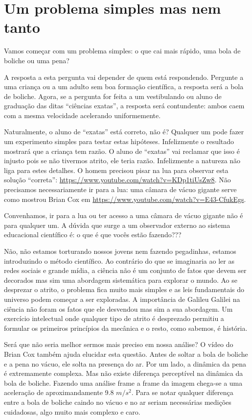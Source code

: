 \chapter{Um problema simples mas nem tanto}
\label{sec:intro}

Vamos começar com um problema simples: o que cai mais rápido, uma bola de boliche ou uma pena?

A resposta a esta pergunta vai depender de quem está respondendo. Pergunte a uma criança ou a um adulto sem boa formação científica, a resposta será a bola de boliche. Agora, se a pergunta for feita a um vestibulando ou aluno de graduação das ditas ``ciências exatas'', a resposta será contundente: ambos caem com a mesma velocidade acelerando uniformemente.

Naturalmente, o aluno de ``exatas'' está correto, não é? Qualquer um pode fazer um experimento simples para testar estas hipóteses. Infelizmente o resultado mostrará que a criança tem razão. O aluno de ``exatas'' vai reclamar que isso é injusto pois se não tivermos atrito, ele teria razão. Infelizmente a natureza não liga para estes detalhes. O homem precisou pisar na lua para observar esta solução ``correta'': \url{https://www.youtube.com/watch?v=KDp1tiUsZw8}. Não precisamos necessariamente ir para a lua: uma câmara de vácuo gigante serve como mostrou Brian Cox em \url{https://www.youtube.com/watch?v=E43-CfukEgs}.

Convenhamos, ir para a lua ou ter acesso a uma câmara de vácuo gigante não é para qualquer um. A dúvida que surge a um observador externo ao sistema educacional científico é: o que é que vocês estão fazendo???

Não, não estamos torturando nossos jovens nem fazendo pegadinhas, estamos introduzindo o método científico. Ao contrário do que se imaginaria ao ler as redes sociais e grande mídia, a ciência não é um conjunto de fatos que devem ser decorados mas sim uma abordagem sistemática para explorar o mundo. Ao se desprezar o atrito, o problema fica muito mais simples e as leis fundamentais do universo podem começar a ser exploradas. A importância de Galileu Galilei na ciência não foram os fatos que ele desvendou mas sim a sua abordagem. Um exercício intelectual onde qualquer tipo de atrito é desprezado permitiu a formular os primeiros princípios da mecânica e o resto, como sabemos,  é história.


Será que não seria melhor sermos mais preciso em nossa análise? O vídeo do Brian Cox também ajuda elucidar esta questão. Antes de soltar a bola de boliche e a pena no vácuo, ele solta na presença do ar. Por um lado, a dinâmica da pena é extremamente complexa. Mas não existe diferença perceptível na dinâmica da bola de boliche. Fazendo uma análise frame a frame da imagem chega-se a uma aceleração de aproximandamente 9.8 $m/s^2$. Para se notar qualquer diferença entre a bola de boliche caindo no vácuo e no ar seriam necessárias medições cuidadosas, algo muito mais complexo e caro.

